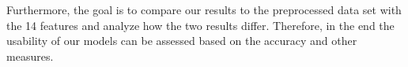 \documentclass[11pt,titlepage,oneside,openany]{article}
\begin{document}
Furthermore, the goal is to compare our results to the preprocessed data set with the 14 features and analyze how the two results differ. Therefore, in the end the usability of our models can be assessed based on the accuracy and other measures. 

\vspace{2cm}
\begin{small}
  \printbibliography
\end{small}

\pagestyle{plain}
\end{document}
